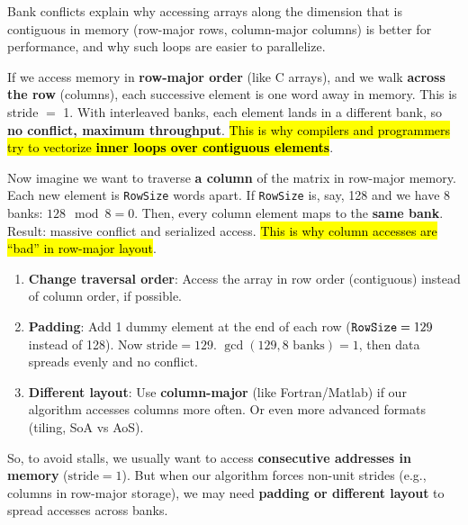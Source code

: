 \highspace
\begin{examplebox}
    Bank conflicts explain why accessing arrays along the dimension that is contiguous in memory (row-major rows, column-major columns) is better for performance, and why such loops are easier to parallelize.

    \highspace
     If we access memory in \textbf{row-major order} (like C arrays), and we walk \textbf{across the row} (columns), each successive element is one word away in memory. This is stride $=$ 1. With interleaved banks, each element lands in a different bank, so \textbf{no conflict, maximum throughput}. \hl{This is why compilers and programmers try to vectorize \textbf{inner loops over contiguous elements}}.

    \highspace
     Now imagine we want to traverse \textbf{a column} of the matrix in row-major memory. Each new element is \texttt{RowSize} words apart. If \texttt{RowSize} is, say, 128 and we have 8 banks: $128 \mod 8 = 0$. Then, every column element maps to the \textbf{same bank}. Result: massive conflict and serialized access. \hl{This is why column accesses are ``bad'' in row-major layout}.

    \highspace
    \begin{enumerate}
        \item \textbf{Change traversal order}: Access the array in row order (contiguous) instead of column order, if possible.
        
        \newpage

        \item \textbf{Padding}: Add 1 dummy element at the end of each row ($\texttt{RowSize}\break = 129$ instead of 128). Now $\text{stride} = 129$. $\gcd\left(129, 8\text{ banks}\right) = 1$, then data spreads evenly and no conflict.
        \item \textbf{Different layout}: Use \textbf{column-major} (like Fortran/Matlab) if our algorithm accesses columns more often. Or even more advanced formats (tiling, SoA vs AoS).
    \end{enumerate}
    So, to avoid stalls, we usually want to access \textbf{consecutive addresses in memory} ($\text{stride} = 1$). But when our algorithm forces non-unit strides (e.g., columns in row-major storage), we may need \textbf{padding or different layout} to spread accesses across banks.
\end{examplebox}

